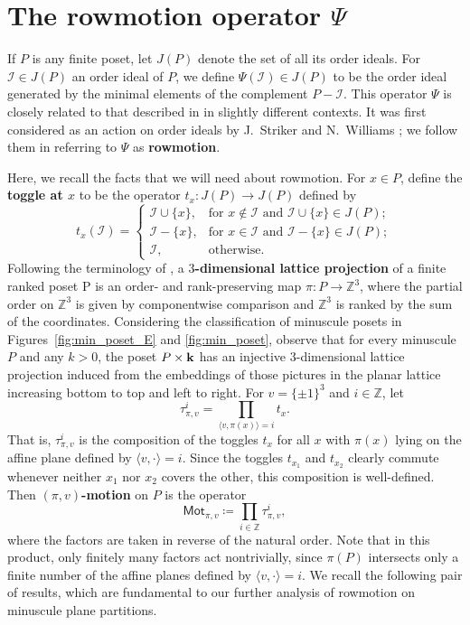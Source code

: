 \documentclass[12pt]{amsart}
\theoremstyle{definition}
\theoremstyle{remark}
\numberwithin{equation}{section}
\newcommand{\mot}{\ensuremath{\mathsf{Mot}}}
\newcommand{\uu}{\mathcal{I}}
\begin{document}
\section{The rowmotion operator $\Psi$}\label{sec:rowmotion}

If $P$ is any finite poset, let $J(P)$ denote the set of all its order ideals. For $\uu \in J(P)$ an order ideal of $P$, we define $\Psi(\uu) \in J(P)$ to be the order ideal generated by the minimal elements of the complement $P - \uu$. This operator $\Psi$ is closely related to that described in \cite{Brouwer.Schrijver,Duchet,Cameron.Fonderflaass} in slightly different contexts. It was first considered as an action on order ideals by J.~Striker and N.~Williams \cite{Striker.Williams}; we follow them in referring to $\Psi$ as {\bf rowmotion}.

Here, we recall the facts that we will need about rowmotion. For $x \in P$, define the {\bf toggle at $x$} to be the operator $t_x : J(P) \to J(P)$ defined by
\[
t_x(\uu) = \left\{ \begin{array}{ll}
        \uu \cup \{x\}, & \text{for } x \notin \uu \text{ and } \uu \cup \{x\} \in J(P); \\
        \uu - \{x\}, & \text{for } x \in \uu \text{ and } \uu - \{x\} \in J(P);\\
        \uu, & \text{otherwise. }
        \end{array} \right.
\]
Following the terminology of \cite{DPS}, a {\bf $3$-dimensional lattice projection} of a finite ranked poset P is an order- and rank-preserving map $\pi : P \to \mathbb{Z}^3$, where the partial order on $\mathbb{Z}^3$ is given by componentwise comparison and $\mathbb{Z}^3$ is ranked by the sum of the coordinates. Considering the classification of minuscule posets in Figures~\ref{fig:min_poset_E} and \ref{fig:min_poset}, observe that for every minuscule $P$ and any $k > 0$, the poset $P \times {\bf k}$ has an injective $3$-dimensional lattice projection induced from the embeddings of those pictures in the planar lattice increasing bottom to top and left to right. For $v = \{\pm 1 \}^3$ and $i \in \mathbb{Z}$, let 
\begin{equation}\label{eq:taudef}
\tau_{\pi,v}^i = \prod_{\langle v, \pi(x) \rangle = i} t_x.
\end{equation}
That is, $\tau_{\pi,v}^i$ is the composition of the toggles $t_x$ for all $x$ with $\pi(x)$ lying on the affine plane defined by $\langle v, \cdot \rangle = i$. Since the toggles $t_{x_1}$ and $t_{x_2}$ clearly commute whenever neither $x_1$ nor $x_2$ covers the other, this composition is well-defined. Then {\bf  $(\pi, v)$-motion} on $P$ is the operator
\[
\mot_{\pi, v} \coloneqq \prod_{i \in \mathbb{Z}} \tau_{\pi,v}^i,
\]
where the factors are taken in reverse of the natural order. Note that in this product, only finitely many factors act nontrivially, since $\pi(P)$ intersects only a finite number of the affine planes defined by $\langle v, \cdot \rangle = i$. We recall the following pair of results, which are fundamental to our further analysis of rowmotion on minuscule plane partitions.
\end{document}
